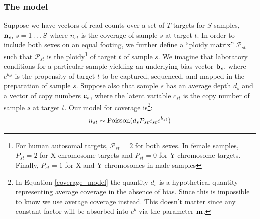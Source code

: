 \documentclass[nofootinbib,amssymb,amsmath]{revtex4}
\newcommand{\vb}{{\bf b}}
\newcommand{\vc}{{\bf c}}
\newcommand{\vn}{{\bf n}}
\newcommand{\vm}{{\bf m}}
\newcommand{\PP}{\mathcal{P}}
\begin{document}
\subsubsection{The model}

Suppose we have vectors of read counts over a set of $T$ targets for $S$ samples, $\vn_s, \, s = 1 \ldots S$ where $n_{st}$ is the coverage of sample $s$ at target $t$. In order to include both sexes on an equal footing, we further define a ``ploidy matrix'' $\PP_{st}$ such that $\PP_{st}$ is the ploidy\footnote{For human autosomal targets, $\PP_{st} = 2$ for both sexes. In female samples, $P_{st} = 2$ for X chromosome targets and $P_{st} = 0$ for Y chromosome targets. Finally, $P_{st} = 1$ for X and Y chromosomes in male samples} of target $t$ of sample $s$. We imagine that laboratory conditions for a particular sample yielding an underlying bias vector $\vb_s$, where $e^{b_{st}}$ is the propensity of target $t$ to be captured, sequenced, and mapped in the preparation of sample $s$.  Suppose also that sample $s$ has an average depth $d_s$ and a vector of copy numbers $\vc_s$, where the latent variable $c_{st}$ is the copy number of sample $s$ at target $t$.  Our model for coverage is\footnote{In Equation \ref{coverage_model} the quantity $d_s$ is a hypothetical quantity representing average coverage in the absence of bias.  Since this is impossible to know we use average coverage instead.  This doesn't matter since any constant factor will be absorbed into $e^b$ via the parameter $\vm$.}:
%
\begin{equation}
n_{st} \sim {\rm Poisson}(d_s \PP_{st} c_{st} e^{b_{st}})
\label{coverage_model}
\end{equation}
\end{document}
